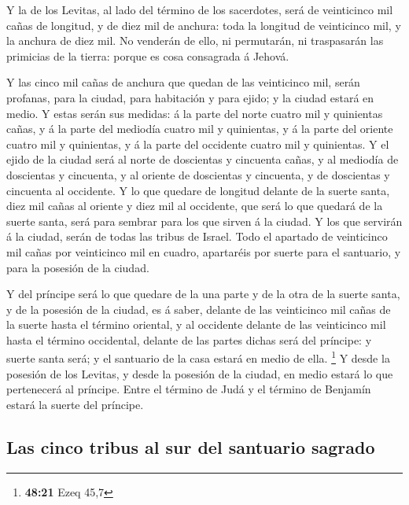  Y la de los Levitas, al lado del término de los
sacerdotes, será de veinticinco mil cañas de longitud, y de diez mil de
anchura: toda la longitud de veinticinco mil, y la anchura de diez mil.
 No venderán de ello, ni permutarán, ni traspasarán las
primicias de la tierra: porque es cosa consagrada á Jehová.

 Y las cinco mil cañas de anchura que quedan de las
veinticinco mil, serán profanas, para la ciudad, para habitación y para
ejido; y la ciudad estará en medio.  Y estas serán sus
medidas: á la parte del norte cuatro mil y quinientas cañas, y á la
parte del mediodía cuatro mil y quinientas, y á la parte del oriente
cuatro mil y quinientas, y á la parte del occidente cuatro mil y
quinientas.  Y el ejido de la ciudad será al norte de
doscientas y cincuenta cañas, y al mediodía de doscientas y cincuenta, y
al oriente de doscientas y cincuenta, y de doscientas y cincuenta al
occidente.  Y lo que quedare de longitud delante de la
suerte santa, diez mil cañas al oriente y diez mil al occidente, que
será lo que quedará de la suerte santa, será para sembrar para los que
sirven á la ciudad.  Y los que servirán á la ciudad,
serán de todas las tribus de Israel.  Todo el apartado de
veinticinco mil cañas por veinticinco mil en cuadro, apartaréis por
suerte para el santuario, y para la posesión de la ciudad.

 Y del príncipe será lo que quedare de la una parte y de
la otra de la suerte santa, y de la posesión de la ciudad, es á saber,
delante de las veinticinco mil cañas de la suerte hasta el término
oriental, y al occidente delante de las veinticinco mil hasta el término
occidental, delante de las partes dichas será del príncipe: y suerte
santa será; y el santuario de la casa estará en medio de ella.
\footnote{\textbf{48:21} Ezeq 45,7}  Y desde la posesión
de los Levitas, y desde la posesión de la ciudad, en medio estará lo que
pertenecerá al príncipe. Entre el término de Judá y el término de
Benjamín estará la suerte del príncipe.

\hypertarget{las-cinco-tribus-al-sur-del-santuario-sagrado}{%
\subsection{Las cinco tribus al sur del santuario
sagrado}\label{las-cinco-tribus-al-sur-del-santuario-sagrado}}

